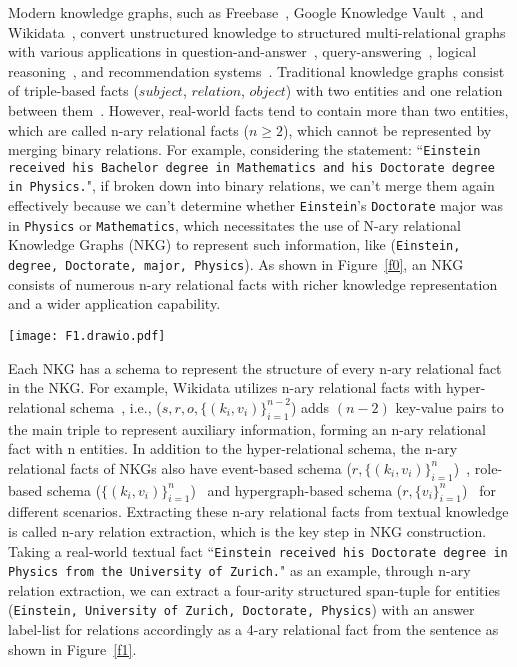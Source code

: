 \documentclass{article} \usepackage{iclr2024_conference,times}
\begin{document}
Modern knowledge graphs, such as Freebase~\citep{Freebase}, Google Knowledge Vault~\citep{GoogleKG}, and Wikidata~\citep{Wikidata}, convert unstructured knowledge to structured multi-relational graphs with various applications in question-and-answer~\citep{KGQA}, query-answering~\citep{KGquery}, logical reasoning~\citep{FuzzQE}, and recommendation systems~\citep{KGRS}. Traditional knowledge graphs consist of triple-based facts ($subject$, $relation$, $object$) with two entities and one relation between them~\citep{TransE, TuckER}. However, real-world facts tend to contain more than two entities, which are called n-ary relational facts ($n\geq 2$), which cannot be represented by merging binary relations. For example, considering the statement: ``\texttt{Einstein received his Bachelor degree in Mathematics and his Doctorate degree in Physics.}", if broken down into binary relations, we can't merge them again effectively because we can't determine whether \texttt{Einstein}'s \texttt{Doctorate} major was in \texttt{Physics} or \texttt{Mathematics}, which necessitates the use of N-ary relational Knowledge Graphs (NKG) to represent such information, like (\texttt{Einstein, degree, Doctorate, major, Physics}). As shown in Figure~\ref{f0}, an NKG consists of numerous n-ary relational facts with richer knowledge representation and a wider application capability.

\begin{figure*}[t]
\centering
\texttt{[image: F1.drawio.pdf]}
\caption{An example of fine-grained n-ary relation extraction in four NKG schemas. }
\label{f1}
\end{figure*}

Each NKG has a schema to represent the structure of every n-ary relational fact in the NKG. For example, Wikidata utilizes n-ary relational facts with hyper-relational schema~\citep{Hinge, StarE, GRAN}, i.e., ($ s, r, o, \{(k_i, v_i)\}_{i=1}^{n-2}$) adds $(n-2)$ key-value pairs to the main triple to represent auxiliary information, forming an n-ary relational fact with n entities. In addition to the hyper-relational schema, the n-ary relational facts of NKGs also have event-based schema ($r,\{(k_i, v_i)\}_{i=1}^{n}$)~\citep{EventSurvey,Text2Event}, role-based schema ($\{(k_i, v_i)\}_{i =1}^{n}$)~\citep{NaLP,RAM} and hypergraph-based schema ($r,\{v_i\}_{i=1}^{n}$)~\citep{m-TransH,HypE} for different scenarios. Extracting these n-ary relational facts from textual knowledge is called n-ary relation extraction, which is the key step in NKG construction. Taking a real-world textual fact ``\texttt{Einstein received his Doctorate degree in Physics from the University of Zurich.}" as an example, through n-ary relation extraction, we can extract a four-arity structured span-tuple for entities (\texttt{Einstein, University of Zurich, Doctorate, Physics}) with an answer label-list for relations accordingly as a 4-ary relational fact from the sentence as shown in Figure~\ref{f1}.
\end{document}

